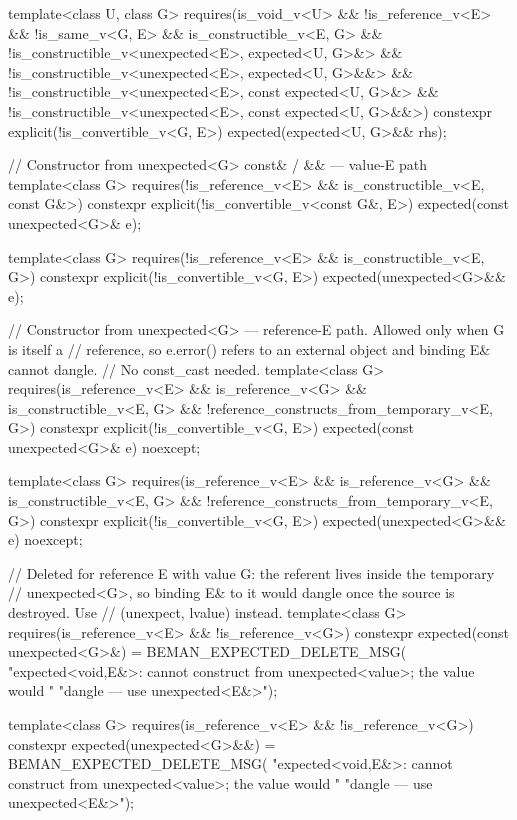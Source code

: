 \begin{codeblock}
{{    template<class U, class G>
      requires(is_void_v<U> && !is_reference_v<E> && !is_same_v<G, E> &&
               is_constructible_v<E, G> &&
               !is_constructible_v<unexpected<E>, expected<U, G>&> &&
               !is_constructible_v<unexpected<E>, expected<U, G>&&> &&
               !is_constructible_v<unexpected<E>, const expected<U, G>&> &&
               !is_constructible_v<unexpected<E>, const expected<U, G>&&>)
    constexpr explicit(!is_convertible_v<G, E>) expected(expected<U, G>&& rhs);

    // Constructor from unexpected<G> const& / && — value-E path
    template<class G>
      requires(!is_reference_v<E> && is_constructible_v<E, const G&>)
    constexpr explicit(!is_convertible_v<const G&, E>) expected(const unexpected<G>& e);

    template<class G>
      requires(!is_reference_v<E> && is_constructible_v<E, G>)
    constexpr explicit(!is_convertible_v<G, E>) expected(unexpected<G>&& e);

    // Constructor from unexpected<G> — reference-E path. Allowed only when G is itself a
    // reference, so e.error() refers to an external object and binding E& cannot dangle.
    // No const_cast needed.
    template<class G>
      requires(is_reference_v<E> && is_reference_v<G> && is_constructible_v<E, G> &&
               !reference_constructs_from_temporary_v<E, G>)
    constexpr explicit(!is_convertible_v<G, E>) expected(const unexpected<G>& e) noexcept;

    template<class G>
      requires(is_reference_v<E> && is_reference_v<G> && is_constructible_v<E, G> &&
               !reference_constructs_from_temporary_v<E, G>)
    constexpr explicit(!is_convertible_v<G, E>) expected(unexpected<G>&& e) noexcept;

    // Deleted for reference E with value G: the referent lives inside the temporary
    // unexpected<G>, so binding E& to it would dangle once the source is destroyed. Use
    // (unexpect, lvalue) instead.
    template<class G>
      requires(is_reference_v<E> && !is_reference_v<G>)
    constexpr expected(const unexpected<G>&) = BEMAN_EXPECTED_DELETE_MSG(
        "expected<void,E&>: cannot construct from unexpected<value>; the value would "
        "dangle — use unexpected<E&>");

    template<class G>
      requires(is_reference_v<E> && !is_reference_v<G>)
    constexpr expected(unexpected<G>&&) = BEMAN_EXPECTED_DELETE_MSG(
        "expected<void,E&>: cannot construct from unexpected<value>; the value would "
        "dangle — use unexpected<E&>");

}}
\end{codeblock}
